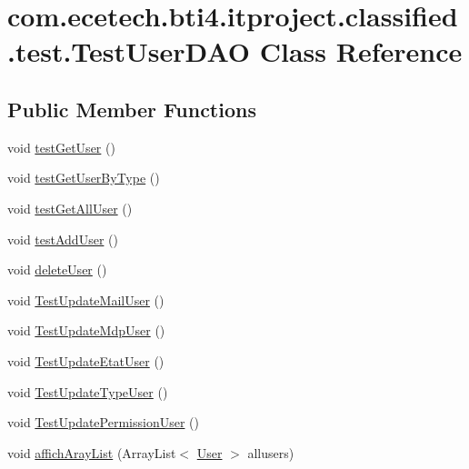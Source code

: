 \hypertarget{classcom_1_1ecetech_1_1bti4_1_1itproject_1_1classified_1_1test_1_1_test_user_d_a_o}{}\section{com.\+ecetech.\+bti4.\+itproject.\+classified.\+test.\+Test\+User\+D\+AO Class Reference}
\label{classcom_1_1ecetech_1_1bti4_1_1itproject_1_1classified_1_1test_1_1_test_user_d_a_o}
\subsection*{Public Member Functions}
\begin{DoxyCompactItemize}
\item 
void \hyperlink{classcom_1_1ecetech_1_1bti4_1_1itproject_1_1classified_1_1test_1_1_test_user_d_a_o_a258cdef33b222bc6e798f03d0450376f}{test\+Get\+User} ()
\item 
void \hyperlink{classcom_1_1ecetech_1_1bti4_1_1itproject_1_1classified_1_1test_1_1_test_user_d_a_o_a50296b17dd52ba6f3c30d39b7c38eea4}{test\+Get\+User\+By\+Type} ()
\item 
void \hyperlink{classcom_1_1ecetech_1_1bti4_1_1itproject_1_1classified_1_1test_1_1_test_user_d_a_o_a1a72ae9959790bace614d33d612f0e0b}{test\+Get\+All\+User} ()
\item 
void \hyperlink{classcom_1_1ecetech_1_1bti4_1_1itproject_1_1classified_1_1test_1_1_test_user_d_a_o_a53bbf153b7a47d3867298f87c5bb048a}{test\+Add\+User} ()
\item 
void \hyperlink{classcom_1_1ecetech_1_1bti4_1_1itproject_1_1classified_1_1test_1_1_test_user_d_a_o_ab71534b2d52a0b87b5ae3ff566f71875}{delete\+User} ()
\item 
void \hyperlink{classcom_1_1ecetech_1_1bti4_1_1itproject_1_1classified_1_1test_1_1_test_user_d_a_o_a901fcb67b37e488097b9a7fc2857a511}{Test\+Update\+Mail\+User} ()
\item 
void \hyperlink{classcom_1_1ecetech_1_1bti4_1_1itproject_1_1classified_1_1test_1_1_test_user_d_a_o_a7430d0cf305aaf07761e3e99fa976bec}{Test\+Update\+Mdp\+User} ()
\item 
void \hyperlink{classcom_1_1ecetech_1_1bti4_1_1itproject_1_1classified_1_1test_1_1_test_user_d_a_o_a690e9766e728a75901b98d741fee98cb}{Test\+Update\+Etat\+User} ()
\item 
void \hyperlink{classcom_1_1ecetech_1_1bti4_1_1itproject_1_1classified_1_1test_1_1_test_user_d_a_o_ada460878fed72508e26283428572146e}{Test\+Update\+Type\+User} ()
\item 
void \hyperlink{classcom_1_1ecetech_1_1bti4_1_1itproject_1_1classified_1_1test_1_1_test_user_d_a_o_ab346e3f666eddf5415a77f96dc16b762}{Test\+Update\+Permission\+User} ()
\item 
void \hyperlink{classcom_1_1ecetech_1_1bti4_1_1itproject_1_1classified_1_1test_1_1_test_user_d_a_o_a618be0e4eb722279de6fde8bc42e121a}{affich\+Aray\+List} (Array\+List$<$ \hyperlink{classcom_1_1ecetech_1_1bti4_1_1itproject_1_1classified_1_1beans_1_1_user}{User} $>$ allusers)
\end{DoxyCompactItemize}


